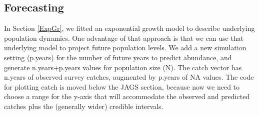 \documentclass[
]{krantz}
\begin{document}
\hypertarget{Forecast}{%
\subsection{Forecasting}\label{Forecast}}

In Section \ref{ExpGr}, we fitted an exponential growth model to describe underlying population dynamics. One advantage of that approach is that we can use that underlying model to project future population levels. We add a new simulation setting (p.years) for the number of future years to predict abundance, and generate n.years+p.years values for population size (N). The catch vector has n.years of observed survey catches, augmented by p.years of NA values. The code for plotting catch is moved below the JAGS section, because now we need to choose a range for the y-axis that will accommodate the observed and predicted catches plus the (generally wider) credible intervals.
\end{document}

